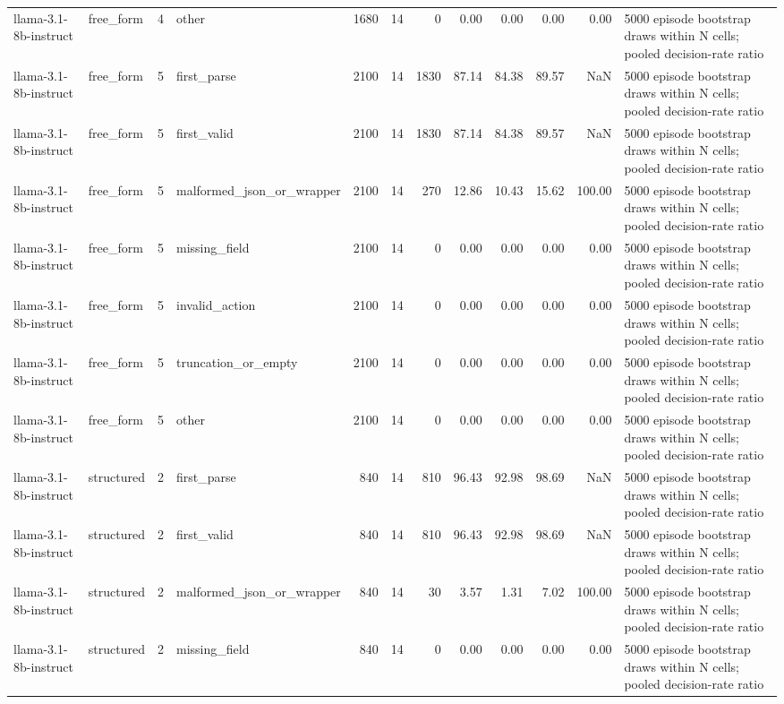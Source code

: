 \begin{tabular}{llllrrrrrrrl}
llama-3.1-8b-instruct & free\_form & 4 & other & 1680 & 14 & 0 & 0.00 & 0.00 & 0.00 & 0.00 & 5000 episode bootstrap draws within N cells; pooled decision-rate ratio \\
llama-3.1-8b-instruct & free\_form & 5 & first\_parse & 2100 & 14 & 1830 & 87.14 & 84.38 & 89.57 & NaN & 5000 episode bootstrap draws within N cells; pooled decision-rate ratio \\
llama-3.1-8b-instruct & free\_form & 5 & first\_valid & 2100 & 14 & 1830 & 87.14 & 84.38 & 89.57 & NaN & 5000 episode bootstrap draws within N cells; pooled decision-rate ratio \\
llama-3.1-8b-instruct & free\_form & 5 & malformed\_json\_or\_wrapper & 2100 & 14 & 270 & 12.86 & 10.43 & 15.62 & 100.00 & 5000 episode bootstrap draws within N cells; pooled decision-rate ratio \\
llama-3.1-8b-instruct & free\_form & 5 & missing\_field & 2100 & 14 & 0 & 0.00 & 0.00 & 0.00 & 0.00 & 5000 episode bootstrap draws within N cells; pooled decision-rate ratio \\
llama-3.1-8b-instruct & free\_form & 5 & invalid\_action & 2100 & 14 & 0 & 0.00 & 0.00 & 0.00 & 0.00 & 5000 episode bootstrap draws within N cells; pooled decision-rate ratio \\
llama-3.1-8b-instruct & free\_form & 5 & truncation\_or\_empty & 2100 & 14 & 0 & 0.00 & 0.00 & 0.00 & 0.00 & 5000 episode bootstrap draws within N cells; pooled decision-rate ratio \\
llama-3.1-8b-instruct & free\_form & 5 & other & 2100 & 14 & 0 & 0.00 & 0.00 & 0.00 & 0.00 & 5000 episode bootstrap draws within N cells; pooled decision-rate ratio \\
llama-3.1-8b-instruct & structured & 2 & first\_parse & 840 & 14 & 810 & 96.43 & 92.98 & 98.69 & NaN & 5000 episode bootstrap draws within N cells; pooled decision-rate ratio \\
llama-3.1-8b-instruct & structured & 2 & first\_valid & 840 & 14 & 810 & 96.43 & 92.98 & 98.69 & NaN & 5000 episode bootstrap draws within N cells; pooled decision-rate ratio \\
llama-3.1-8b-instruct & structured & 2 & malformed\_json\_or\_wrapper & 840 & 14 & 30 & 3.57 & 1.31 & 7.02 & 100.00 & 5000 episode bootstrap draws within N cells; pooled decision-rate ratio \\
llama-3.1-8b-instruct & structured & 2 & missing\_field & 840 & 14 & 0 & 0.00 & 0.00 & 0.00 & 0.00 & 5000 episode bootstrap draws within N cells; pooled decision-rate ratio \\

\end{tabular}
